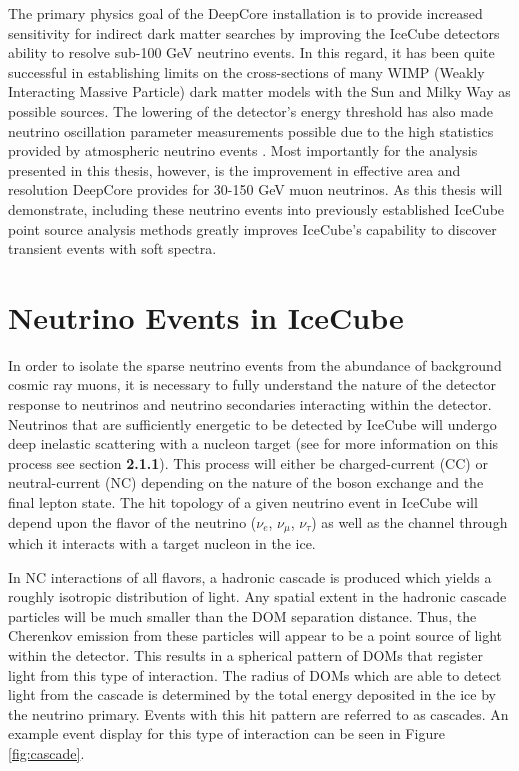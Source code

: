 \documentclass{gatech-thesis}
\begin{document}
The primary physics goal of the DeepCore installation is to provide increased sensitivity for indirect dark matter searches by improving the IceCube detectors ability to resolve sub-100 GeV neutrino events. In this regard, it has been quite successful in establishing limits on the cross-sections of many WIMP (Weakly Interacting Massive Particle) dark matter models with the Sun \cite{2013PhRvL.110m1302A} and Milky Way \cite{2011PhRvD..84b2004A} as possible sources. The lowering of the detector's energy threshold has also made neutrino oscillation parameter measurements possible due to the high statistics provided by atmospheric neutrino events \cite{2013PhRvL.111h1801A}. Most importantly for the analysis presented in this thesis, however, is the improvement in effective area and resolution DeepCore provides for 30-150 GeV muon neutrinos. As this thesis will demonstrate, including these neutrino events into previously established IceCube point source analysis methods greatly improves IceCube's capability to discover transient events with soft spectra.
\section{Neutrino Events in IceCube}

In order to isolate the sparse neutrino events from the abundance of background cosmic ray muons, it is necessary to fully understand the nature of the detector response to neutrinos and neutrino secondaries interacting within the detector. Neutrinos that are sufficiently energetic to be detected by IceCube will undergo deep inelastic scattering with a nucleon target (see for more information on this process see section \textbf{2.1.1}). This process will either be charged-current (CC) or neutral-current (NC) depending on the nature of the boson exchange and the final lepton state. The hit topology of a given neutrino event in IceCube will depend upon the flavor of the neutrino ($\nu_{e}$, $\nu_{\mu}$, $\nu_{\tau}$) as well as the channel through which it interacts with a target nucleon in the ice.

In NC interactions of all flavors, a hadronic cascade is produced which yields a roughly isotropic distribution of light. Any spatial extent in the hadronic cascade particles will be much smaller than the DOM separation distance. Thus, the Cherenkov emission from these particles will appear to be a point source of light within the detector. This results in a spherical pattern of DOMs that register light from this type of interaction. The radius of DOMs which are able to detect light from the cascade is determined by the total energy deposited in the ice by the neutrino primary. Events with this hit pattern are referred to as cascades. An example event display for this type of interaction can be seen in Figure \ref{fig:cascade}.
\end{document}
